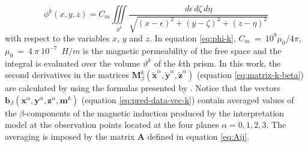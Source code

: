 \documentclass[galley,gc]{agutex}
\begin{document}
\begin{article}
\begin{equation}
\phi^{k}(x, y, z) = 
    C_{m}
    \iiint\limits_{\vartheta^{k}}
    \frac{d\epsilon \, d\zeta \, d\eta}
         {\sqrt{(x - \epsilon)^{2} +
                (y - \zeta)^{2} +
                (z - \eta)^{2}}}
\label{eq:phi-k}
\end{equation}
with respect to the variables $x$, $y$ and $z$.
In equation \ref{eq:phi-k},
$C_{m}~=~10^{9}\mu_{0}/4\pi$, $\mu_{0}~=~4~\pi~10^{-7}$~$H/m$ is the 
magnetic permeability of the free space
and the integral is evaluated over the 
volume $\vartheta^{k}$ of the $k$th prism. 
In this work, the second derivatives in the matrices
$\mathbf{M}_{\beta}^{k}(\tilde{\mathbf{x}}^{\alpha}, 
\tilde{\mathbf{y}}^{\alpha}, \tilde{\mathbf{z}}^{\alpha})$ 
(equation \ref{eq:matrix-k-beta}) are calculated by using the formulas 
presented by \citet{nagy2000}.
Notice that the vectors $\mathbf{b}_{\beta}(\mathbf{x}^{\alpha},
\mathbf{y}^{\alpha}, \mathbf{z}^{\alpha}, \mathbf{m}^{k})$
(equation \ref{eq:pred-data-vec-k}) contain averaged values of
the $\beta$-components of the magnetic induction produced by
the interpretation model at the observation points located at
the four planes $\alpha = 0, 1, 2, 3$. The averaging is imposed
by the matrix $\mathbf{A}$ defined in equation \ref{eq:Aij}.


\end{article}
\end{document}
